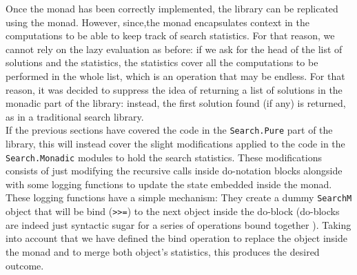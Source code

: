 Once the monad has been correctly implemented, the library can be replicated
using the monad. However, since,the monad encapsulates context in the
computations to be able to keep track of search statistics. For that reason,
we cannot rely on the lazy evaluation as before: if we ask for the head of the
list of solutions and the statistics, the statistics cover all the computations
to be performed in the whole list, which is an operation that may be endless.
For that reason, it was decided to suppress the idea of returning a list of
solutions in the monadic part of the library: instead, the first solution found
(if any) is returned, as in a traditional search library.\\

If the previous sections have covered the code in the \texttt{Search.Pure} part
of the library, this will instead cover the slight modifications applied to the
code in the \texttt{Search.Monadic} modules to hold the search statistics.
These modifications consists of just modifying the recursive calls inside
do-notation blocks alongside with some logging functions to update the state
embedded inside the monad.\\

These logging functions have a simple mechanism: They create a dummy
\texttt{SearchM} object that will be bind (\texttt{>>=}) to the next object
inside the do-block (do-blocks are indeed just syntactic sugar for a series of
operations bound together \cite{haskell99}). Taking into account that we have
defined the bind operation to replace the object inside the monad and to merge
both object's statistics, this produces the desired outcome.

\newpage

